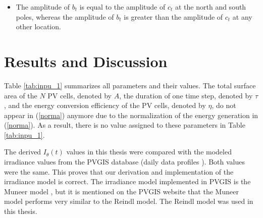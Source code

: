 \begin{itemize}
\begin{figure}[H]
\end{figure}
\item The amplitude of $b_t$ is equal to the amplitude of $c_t$ at the north and south poles, whereas the amplitude of $b_t$ is greater than the amplitude of $c_t$ at any other location. 
\end{itemize}



\section{Results and Discussion\label{results}}
Table \ref{tab:inpu_1} summarizes all parameters and their values. 
The total surface area of the $N$ PV cells, denoted by $A$, the duration of one time step, denoted by $\tau$, and the energy conversion efficiency of the PV cells, denoted by $\eta$, do not appear in (\ref{norma}) anymore due to the normalization of the energy generation in (\ref{norma}). As a result, there is no value assigned to these parameters in Table \ref{tab:inpu_1}.

The derived $I_{\theta}(t)$ values in this thesis were compared with the modeled irradiance values from the PVGIS database (daily data profiles \cite{tool}). Both values were the same. This proves that our derivation and implementation of the irradiance model is correct. The irradiance model implemented in PVGIS \cite{PVGIS} is the Muneer model \cite{muneer}, but it is mentioned on the PVGIS website \cite{method} that the Muneer model performs very similar to the Reindl model. The Reindl model was used in this thesis. 


